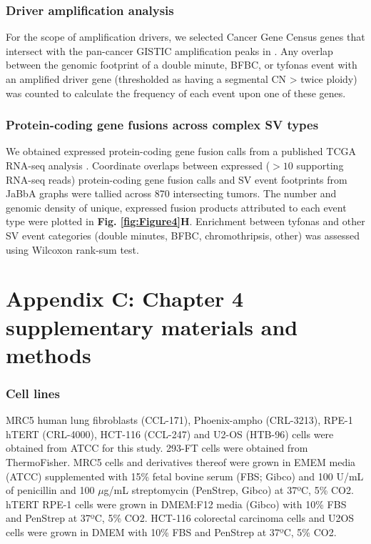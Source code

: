 \documentclass[phd,tocprelim]{cornell}
\begin{document}
\subsection*{Driver amplification analysis}

For the scope of amplification drivers, we selected Cancer Gene Census genes that intersect with the pan-cancer GISTIC amplification peaks in \cite{Zack:2013f1f}. Any overlap between the genomic footprint of a double minute, BFBC, or tyfonas event with an amplified driver gene (thresholded as having a segmental CN > twice ploidy) was counted to calculate the frequency of each event upon one of these genes.

\subsection*{Protein-coding gene fusions across complex SV types}

We obtained expressed protein-coding gene fusion calls from a published TCGA RNA-seq analysis \cite{Dehghannasiri2019-hk}.  Coordinate overlaps between expressed ($>10$ supporting RNA-seq reads) protein-coding gene fusion calls and SV event footprints from JaBbA graphs were tallied across 870 intersecting tumors. The number and genomic density of unique, expressed fusion products attributed to each event type were plotted in \textbf{Fig. \ref{fig:Figure4}H}.  Enrichment between tyfonas and other SV event categories (double minutes, BFBC, chromothripsis, other) was assessed using Wilcoxon rank-sum test.


\chapter*{Appendix C: Chapter 4 supplementary materials and methods} \label{app:c}
\subsection*{Cell lines}
MRC5 human lung fibroblasts (CCL-171), Phoenix-ampho (CRL-3213), RPE-1 hTERT (CRL-4000), HCT-116 (CCL-247) and U2-OS (HTB-96) cells were obtained from ATCC for this study. 293-FT cells were obtained from ThermoFisher. MRC5 cells and derivatives thereof were grown in EMEM media (ATCC) supplemented with 15\% fetal bovine serum (FBS; Gibco) and 100 U/mL of penicillin and 100 $\mu$g/mL streptomycin (PenStrep, Gibco) at 37ºC, 5\% CO2. hTERT RPE-1 cells were grown in DMEM:F12 media (Gibco) with 10\% FBS and PenStrep at 37ºC, 5\% CO2. HCT-116 colorectal carcinoma cells and U2OS cells were grown in DMEM with 10\% FBS and PenStrep at 37ºC, 5\% CO2.
\end{document}
